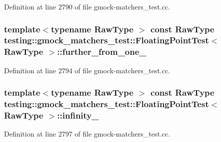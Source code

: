 Definition at line 2790 of file gmock-\/matchers\+\_\+test.\+cc.

\subsubsection[{\texorpdfstring{further\+\_\+from\+\_\+one\+\_\+}{further_from_one_}}]{\setlength{\rightskip}{0pt plus 5cm}template$<$typename Raw\+Type $>$ const Raw\+Type {\bf testing\+::gmock\+\_\+matchers\+\_\+test\+::\+Floating\+Point\+Test}$<$ Raw\+Type $>$\+::further\+\_\+from\+\_\+one\+\_\+\hspace{0.3cm}{\ttfamily [protected]}}\hypertarget{classtesting_1_1gmock__matchers__test_1_1_floating_point_test_a049ba2d5d371e8aea6ada1ab5312b1bb}{}\label{classtesting_1_1gmock__matchers__test_1_1_floating_point_test_a049ba2d5d371e8aea6ada1ab5312b1bb}


Definition at line 2794 of file gmock-\/matchers\+\_\+test.\+cc.

\subsubsection[{\texorpdfstring{infinity\+\_\+}{infinity_}}]{\setlength{\rightskip}{0pt plus 5cm}template$<$typename Raw\+Type $>$ const Raw\+Type {\bf testing\+::gmock\+\_\+matchers\+\_\+test\+::\+Floating\+Point\+Test}$<$ Raw\+Type $>$\+::infinity\+\_\+\hspace{0.3cm}{\ttfamily [protected]}}\hypertarget{classtesting_1_1gmock__matchers__test_1_1_floating_point_test_a21d8a019a6365ddff80e301a6163f43f}{}\label{classtesting_1_1gmock__matchers__test_1_1_floating_point_test_a21d8a019a6365ddff80e301a6163f43f}


Definition at line 2797 of file gmock-\/matchers\+\_\+test.\+cc.

